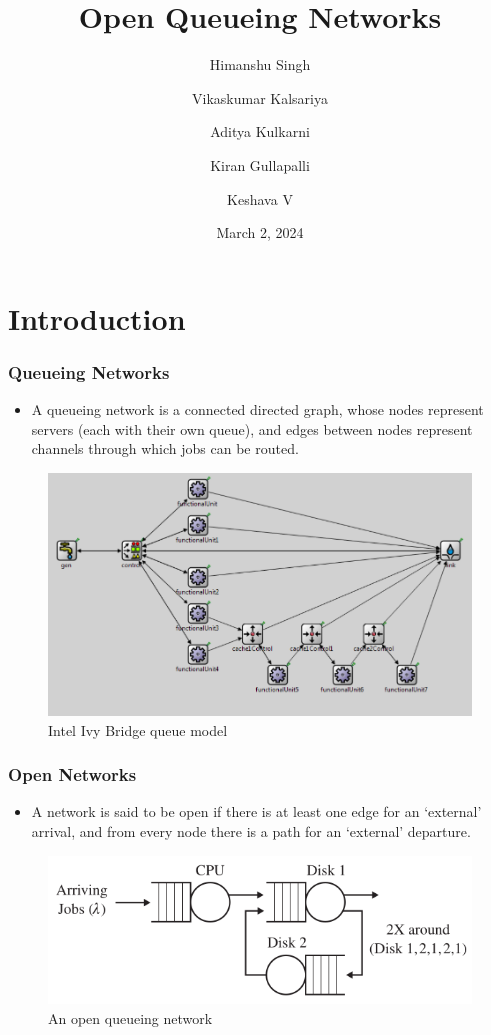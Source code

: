 \documentclass[10pt,notes]{beamer}
\title{Open Queueing Networks}
\author{Himanshu Singh \and Vikaskumar Kalsariya \and Aditya Kulkarni \and Kiran Gullapalli \and Keshava V}
\date{March 2, 2024}
\begin{document}
\begin{frame}
    \titlepage
\end{frame}

\begin{frame}
    \tableofcontents
\end{frame}

\section{Introduction}

\begin{frame}
    \frametitle{Queueing Networks}
    \begin{itemize}
        \item A queueing network is a connected directed graph, whose nodes represent servers (each with their own queue), and edges between nodes represent channels through which jobs can be routed.
    \end{itemize}
    \begin{figure}
        \includegraphics[width=0.6\linewidth]{images/ivy_bridge.png}
        \caption{Intel Ivy Bridge queue model \cite{damian}}
    \end{figure}
\end{frame}
    
\begin{frame}
    \frametitle{Open Networks}
    \begin{itemize}
        \item A network is said to be open if there is at least one edge for an `external' arrival, and from every node there is a path for an `external' departure.
    \end{itemize}
    \begin{figure}
        \includegraphics[width=0.55\linewidth]{images/open_network.png}
        \caption{An open queueing network}
    \end{figure}
\end{frame}
\end{document}
